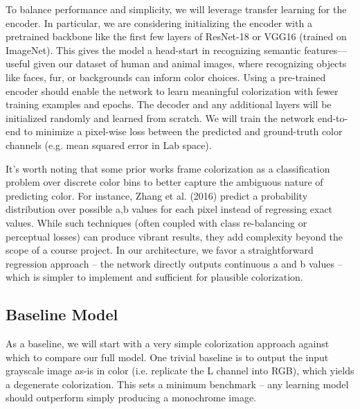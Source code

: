 \documentclass{article} %
\begin{document}
To balance performance and simplicity, we will leverage transfer learning for the encoder. In particular, we are considering initializing the encoder with a pretrained backbone like the first few layers of ResNet-18 or VGG16 (trained on ImageNet). This gives the model a head-start in recognizing semantic features—useful given our dataset of human and animal images, where recognizing objects like faces, fur, or backgrounds can inform color choices. \cite{olah2022lettherebecolor} Using a pre-trained encoder should enable the network to learn meaningful colorization with fewer training examples and epochs. \cite{olah2022lettherebecolor} The decoder and any additional layers will be initialized randomly and learned from scratch. We will train the network end-to-end to minimize a pixel-wise loss between the predicted and ground-truth color channels (e.g. mean squared error in Lab space).

It’s worth noting that some prior works frame colorization as a classification problem over discrete color bins to better capture the ambiguous nature of predicting color. For instance, Zhang et al. (2016) predict a probability distribution over possible a,b values for each pixel instead of regressing exact values. \cite{olah2022lettherebecolor} While such techniques (often coupled with class re-balancing or perceptual losses) can produce vibrant results, they add complexity beyond the scope of a course project. In our architecture, we favor a straightforward regression approach – the network directly outputs continuous a and b values – which is simpler to implement and sufficient for plausible colorization.

\subsection{Baseline Model}

As a baseline, we will start with a very simple colorization approach against which to compare our full model. One trivial baseline is to output the input grayscale image as-is in color (i.e. replicate the L channel into RGB), which yields a degenerate colorization. This sets a minimum benchmark – any learning model should outperform simply producing a monochrome image.
\end{document}
